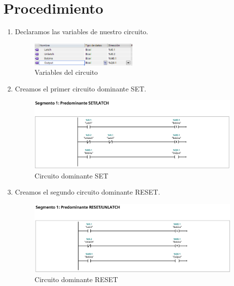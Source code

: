 \documentclass[12pt]{report}
\begin{document}
\section{Procedimiento}
\begin{enumerate}
  \item Declaramos las variables de nuestro circuito.
        \begin{figure}[H]
          \centering
          \includegraphics[width=0.5\textwidth]{screenshots/variables.png}
          \caption{Variables del circuito}
          \label{fig:variables}
        \end{figure}
  \item Creamos el primer circuito dominante SET.
        \begin{figure}[H]
          \centering
          \includegraphics[width=1\textwidth]{screenshots/PredominanteSET.png}
          \caption{Circuito dominante SET}
          \label{fig:set}
        \end{figure}
  \item Creamos el segundo circuito dominante RESET.
        \begin{figure}[H]
          \centering
          \includegraphics[width=1\textwidth]{screenshots/PredominanteRESET.png}
          \caption{Circuito dominante RESET}
          \label{fig:reset}
        \end{figure}
\end{enumerate}
\newpage
\end{document}
